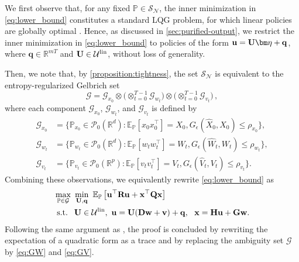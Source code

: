 \documentclass[letterpaper, 10 pt, conference]{ieeeconf}  %
\makeatletter
\renewenvironment{proof}[1][\proofname]{\par
  \pushQED{\qed}%
  \normalfont \topsep\z@
  \trivlist
  \item[\hskip2em
        \itshape
    #1\@addpunct{:}]\ignorespaces
}{%
  \popQED\endtrivlist\@endpefalse
}
\theoremstyle{ieeeconf}
\newcommand{\R}{\mathbb{R}}
\newcommand{\Prob}{\mathbb{P}}
\makeatother
\begin{document}
\begin{proof}
We first observe that, for any fixed $\Prob\in\mathcal{S_N}$, the inner minimization in \eqref{eq:lower_bound} constitutes a standard LQG problem, for which linear policies are globally optimal \cite{bertsekas2012dynamic}. Hence, as discussed in \cref{sec:purified-output}, we restrict the inner minimization in \eqref{eq:lower_bound} to policies of the form $\bf u = U\bm\eta + q$, where $\mathbf{q} \in \R^{mT}$ and $\bf U \in \mathcal{U}^\text{lin}$, without loss of generality.

Then, we note that, by \cref{proposition:tightness}, the set $\mathcal{S_N}$ is equivalent to the entropy-regularized Gelbrich set
\begin{equation}
\label{eq:Gelbrich}
\mathcal{G} = \mathcal{G}_{x_{0}} \otimes \Big(\otimes_{t=0}^{T-1} \mathcal{G}_{w_{t}}\Big) \otimes \Big(\otimes_{t=0}^{T-1} \mathcal{G}_{v_{t}}\Big)\,,
\end{equation}
where each component $\mathcal{G}_{x_{0}}$, $\mathcal{G}_{w_{t}}$, and $\mathcal{G}_{v_{t}}$ is defined by
    \begin{align*}
        \mathcal{G}_{x_0}\! &=\! \big\{ \mathbb{P}_{x_0}\! \in\! \mathcal{P}_0(\mathbb{R}^d) \!: \!
        \mathbb{E}_{\mathbb{P}}[x_0 x_0^\top] = X_0,G_\epsilon(\hat{X}_0, X_0)\! \leq \!\rho_{x_0} \big\}, \nonumber\\
        \mathcal{G}_{w_t}\! &=\!\big\{ \mathbb{P}_{w_t}\! \in\! \mathcal{P}_0(\mathbb{R}^d) \!:\!\mathbb{E}_{\mathbb{P}}[w_t w_t^\top] = W_t, G_\epsilon(\hat{W}_t, W_t)\! \leq\! \rho_{w_t} \big\}, \nonumber\\
        \mathcal{G}_{v_t}\! &=\!\big\{ \mathbb{P}_{v_t}\! \in\! \mathcal{P}_0(\mathbb{R}^p) \!:\!\mathbb{E}_{\mathbb{P}}[v_t v_t^\top] = V_t, G_\epsilon(\hat{V}_t, V_t)\! \leq\! \rho_{v_t} \big\}.
    \end{align*}
    Combining these observations, we equivalently rewrite \eqref{eq:lower_bound} as
\begin{align*}
&\max_{\mathbb{P} \in \mathcal{G}}\ \min_{\bf U, q}\ \mathbb{E}_{\mathbb{P}}\left[\bf u^{\top} R u + x^{\top} Q x \right]
\\
&\text { s.t. }\,\, \mathbf{U} \in \mathcal{U}^\text{lin},\ \bf {u = U(Dw + v) + q}, ~~\bf {x = H u + G w}.
\end{align*}
Following the same argument as \cite[Proposition 3.2]{taskesen2023distributionally}, the proof is concluded by rewriting the expectation of a quadratic form as a trace and by replacing the ambiguity set $\mathcal{G}$ by \eqref{eq:GW} and \eqref{eq:GV}.

\end{proof}
\end{document}
